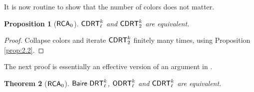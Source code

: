 \documentclass{amsart}
\newtheorem{thm}{Theorem}[section]
\newtheorem{prop}[thm]{Proposition}
\theoremstyle{definition}
\theoremstyle{remark}
\newcommand{\system}[1]{\mbox{\fontfamily{cmss}\fontshape{n}\fontseries{m}%
    \selectfont#1}}
\newcommand{\RCA}{\system{RCA}\ensuremath{_0}}
\newcommand{\BaDRT}{\system{Baire-DRT}}
\newcommand{\cDRT}{\system{CDRT}}
\newcommand{\ODRT}{\system{ODRT}}
\begin{document}
It is now routine to show that the number of colors does not matter.

\begin{prop}[$\RCA$]
$\cDRT^k_{\ell}$ and $\cDRT^k_{2}$ are equivalent.
\end{prop}
\begin{proof}
Collapse colors and iterate $\cDRT^k_2$ finitely many times, 
using Proposition \ref{prop:2.2}.
\end{proof}

The next proof is essentially an effective version of an argument in \cite{pv}.

\begin{thm}[$\RCA$]
\label{thm:2.4}
$\BaDRT^k_{\ell}$, $\ODRT^k_\ell$ and $\cDRT^k_\ell$ are equivalent.
\end{thm}
\end{document}
